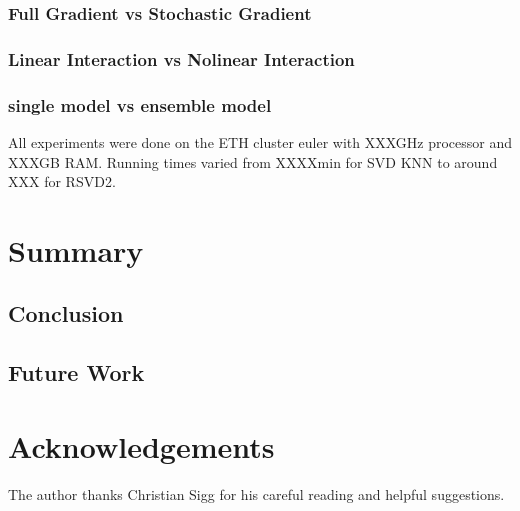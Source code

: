 \documentclass[10pt,conference,compsocconf]{IEEEtran}
\begin{document}
\subsubsection{Full Gradient vs Stochastic Gradient}
\subsubsection{Linear Interaction vs Nolinear Interaction}
\subsubsection{single model vs ensemble model}

All experiments were done on the ETH cluster euler with XXXGHz processor and XXXGB RAM. Running times varied from XXXXmin for SVD KNN to around XXX for RSVD2.

\section{Summary}
\subsection{Conclusion}
\subsection{Future Work} 



\section*{Acknowledgements}
The author thanks Christian Sigg for his careful reading and helpful
suggestions.



\end{document}
